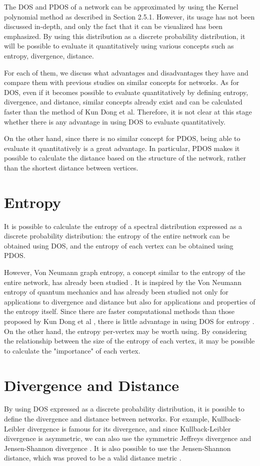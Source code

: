 \documentclass[senior,final,11pt]{iscs-thesis}
\begin{document}
The DOS and PDOS of a network can be approximated by using the Kernel polynomial method as described in Section 2.5.1. However, its usage has not been discussed in-depth, and only the fact that it can be visualized has been emphasized.
By using this distribution as a discrete probability distribution, it will be possible to evaluate it quantitatively using various concepts such as entropy, divergence, distance.

For each of them, we discuss what advantages and disadvantages they have and compare them with previous studies on similar concepts for networks. As for DOS, even if it becomes possible to evaluate quantitatively by defining entropy, divergence, and distance, similar concepts already exist and can be calculated faster than the method of Kun Dong et al. Therefore, it is not clear at this stage whether there is any advantage in using DOS to evaluate quantitatively.

On the other hand, since there is no similar concept for PDOS, being able to evaluate it quantitatively is a great advantage. In particular, PDOS makes it possible to calculate the distance based on the structure of the network, rather than the shortest distance between vertices.

\section{Entropy}
It is possible to calculate the entropy of a spectral distribution expressed as a discrete probability distribution: the entropy of the entire network can be obtained using DOS, and the entropy of each vertex can be obtained using PDOS.

However, Von Neumann graph entropy, a concept similar to the entropy of the entire network, has already been studied \cite{braunstein2006laplacian, chen2019fast,tsitsulin2020just}. It is inspired by the Von Neumann entropy of quantum mechanics and has already been studied not only for applications to divergence and distance but also for applications and properties of the entropy itself. Since there are faster computational methods \cite{chen2019fast,tsitsulin2020just} than those proposed by Kun Dong et al \cite{dong2019network}, there is little advantage in using DOS for entropy .
On the other hand, the entropy per-vertex may be worth using. By considering the relationship between the size of the entropy of each vertex, it may be possible to calculate the "importance" of each vertex.


\section{Divergence and Distance}
By using DOS expressed as a discrete probability distribution, it is possible to define the divergence and distance between networks. For example, Kullback-Leibler divergence \cite{kullback1951information} is famous for its divergence, and since Kullback-Leibler divergence is asymmetric, we can also use the symmetric Jeffreys divergence and Jensen-Shannon divergence \cite{nielsen2019jensen, lin1991divergence, jeffreys1946invariant}. It is also possible to use the Jensen-Shannon distance, which was proved to be a valid distance metric \cite{endres2003new}.
\end{document}
